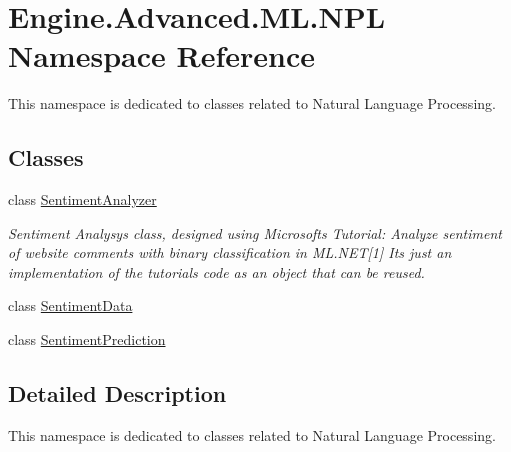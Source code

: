 \hypertarget{namespace_engine_1_1_advanced_1_1_m_l_1_1_n_p_l}{}\section{Engine.\+Advanced.\+M\+L.\+N\+PL Namespace Reference}
\label{namespace_engine_1_1_advanced_1_1_m_l_1_1_n_p_l}


This namespace is dedicated to classes related to Natural Language Processing.  


\subsection*{Classes}
\begin{DoxyCompactItemize}
\item 
class \mbox{\hyperlink{class_engine_1_1_advanced_1_1_m_l_1_1_n_p_l_1_1_sentiment_analyzer}{Sentiment\+Analyzer}}
\begin{DoxyCompactList}\small\item\em Sentiment Analysys class, designed using Microsoft\textquotesingle{}s Tutorial\+: Analyze sentiment of website comments with binary classification in M\+L.\+N\+ET\mbox{[}1\mbox{]} It\textquotesingle{}s just an implementation of the tutorial\textquotesingle{}s code as an object that can be reused. \end{DoxyCompactList}\item 
class \mbox{\hyperlink{class_engine_1_1_advanced_1_1_m_l_1_1_n_p_l_1_1_sentiment_data}{Sentiment\+Data}}
\item 
class \mbox{\hyperlink{class_engine_1_1_advanced_1_1_m_l_1_1_n_p_l_1_1_sentiment_prediction}{Sentiment\+Prediction}}
\end{DoxyCompactItemize}


\subsection{Detailed Description}
This namespace is dedicated to classes related to Natural Language Processing. 

